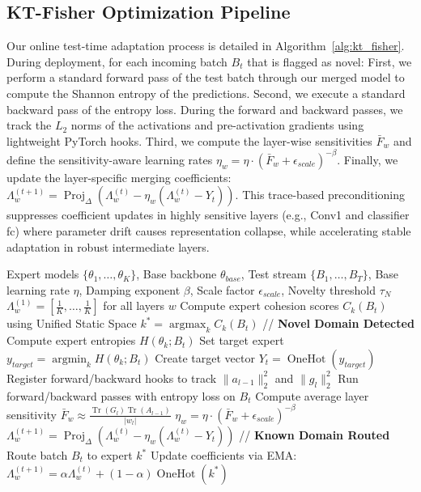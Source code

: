 \documentclass{article}
\theoremstyle{plain}
\theoremstyle{definition}
\theoremstyle{remark}
\begin{document}
\subsection{KT-Fisher Optimization Pipeline}
Our online test-time adaptation process is detailed in Algorithm~\ref{alg:kt_fisher}. During deployment, for each incoming batch $B_t$ that is flagged as novel:
First, we perform a standard forward pass of the test batch through our merged model to compute the Shannon entropy of the predictions. Second, we execute a standard backward pass of the entropy loss. During the forward and backward passes, we track the $L_2$ norms of the activations and pre-activation gradients using lightweight PyTorch hooks. Third, we compute the layer-wise sensitivities $\bar{F}_w$ and define the sensitivity-aware learning rates $\eta_w = \eta \cdot (\bar{F}_w + \epsilon_{scale})^{-\beta}$. Finally, we update the layer-specific merging coefficients: $\Lambda_w^{(t+1)} = \operatorname{Proj}_{\Delta} \left( \Lambda_w^{(t)} - \eta_w (\Lambda_w^{(t)} - Y_t) \right)$. This trace-based preconditioning suppresses coefficient updates in highly sensitive layers (e.g., Conv1 and classifier fc) where parameter drift causes representation collapse, while accelerating stable adaptation in robust intermediate layers.

\begin{algorithm}[tb]
\caption{KT-Fisher Online Test-Time Model Merging}
\label{alg:kt_fisher}
\begin{algorithmic}[1]
 Expert models $\{\theta_1, \dots, \theta_K\}$, Base backbone $\theta_{base}$, Test stream $\{B_1, \dots, B_T\}$, Base learning rate $\eta$, Damping exponent $\beta$, Scale factor $\epsilon_{scale}$, Novelty threshold $\tau_N$
 $\Lambda_w^{(1)} = [ \frac{1}{K}, \dots, \frac{1}{K} ]$ for all layers $w$
    \STATE Compute expert cohesion scores $C_k(B_t)$ using Unified Static Space
    \STATE $k^* = \operatorname{arg max}_k C_k(B_t)$
        \STATE // {\bfseries Novel Domain Detected}
        \STATE Compute expert entropies $H(\theta_k; B_t)$
        \STATE Set target expert $y_{target} = \operatorname{arg min}_k H(\theta_k; B_t)$
        \STATE Create target vector $Y_t = \operatorname{OneHot}(y_{target})$
        \STATE Register forward/backward hooks to track $\|a_{l-1}\|_2^2$ and $\|g_l\|_2^2$
        \STATE Run forward/backward passes with entropy loss on $B_t$
            \STATE Compute average layer sensitivity $\bar{F}_w \approx \frac{\operatorname{Tr}(G_l) \operatorname{Tr}(A_{l-1})}{|w_l|}$
            \STATE $\eta_w = \eta \cdot (\bar{F}_w + \epsilon_{scale})^{-\beta}$
            \STATE $\Lambda_w^{(t+1)} = \operatorname{Proj}_{\Delta} \left( \Lambda_w^{(t)} - \eta_w (\Lambda_w^{(t)} - Y_t) \right)$
        \ENDFOR
    \ELSE
        \STATE // {\bfseries Known Domain Routed}
        \STATE Route batch $B_t$ to expert $k^*$
        \STATE Update coefficients via EMA: $\Lambda_w^{(t+1)} = \alpha \Lambda_w^{(t)} + (1-\alpha) \operatorname{OneHot}(k^*)$
    \ENDIF
\ENDFOR
\end{algorithmic}
\end{algorithm}
\end{document}
